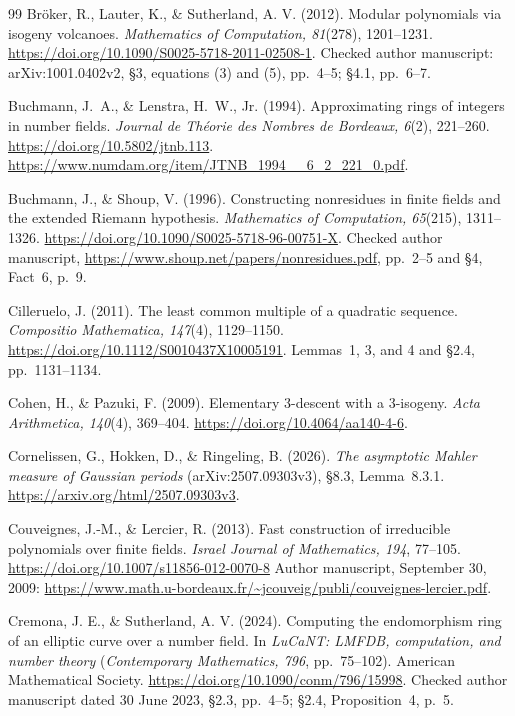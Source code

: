 \documentclass[11pt]{article}
\theoremstyle{definition}
\theoremstyle{remark}
\begin{document}
\begin{thebibliography}{99}
Br\"oker, R., Lauter, K., \& Sutherland, A. V. (2012).
Modular polynomials via isogeny volcanoes.
\emph{Mathematics of Computation, 81}(278), 1201--1231.
\url{https://doi.org/10.1090/S0025-5718-2011-02508-1}.
Checked author manuscript: arXiv:1001.0402v2, \S3, equations (3)
and (5), pp.~4--5; \S4.1, pp.~6--7.

Buchmann, J.~A., \& Lenstra, H.~W., Jr. (1994).
Approximating rings of integers in number fields.
\emph{Journal de Th\'eorie des Nombres de Bordeaux, 6}(2), 221--260.
\url{https://doi.org/10.5802/jtnb.113}.
\url{https://www.numdam.org/item/JTNB_1994__6_2_221_0.pdf}.

Buchmann, J., \& Shoup, V. (1996).
Constructing nonresidues in finite fields and the extended Riemann hypothesis.
\emph{Mathematics of Computation, 65}(215), 1311--1326.
\url{https://doi.org/10.1090/S0025-5718-96-00751-X}.
Checked author manuscript, \url{https://www.shoup.net/papers/nonresidues.pdf},
pp.~2--5 and \S4, Fact~6, p.~9.

Cilleruelo, J. (2011).
The least common multiple of a quadratic sequence.
\emph{Compositio Mathematica, 147}(4), 1129--1150.
\url{https://doi.org/10.1112/S0010437X10005191}.
Lemmas~1, 3, and 4 and \S2.4, pp.~1131--1134.

Cohen, H., \& Pazuki, F. (2009).
Elementary 3-descent with a 3-isogeny.
\emph{Acta Arithmetica, 140}(4), 369--404.
\url{https://doi.org/10.4064/aa140-4-6}.

Cornelissen, G., Hokken, D., \& Ringeling, B. (2026).
\emph{The asymptotic Mahler measure of Gaussian periods}
(arXiv:2507.09303v3), \S8.3, Lemma~8.3.1.
\url{https://arxiv.org/html/2507.09303v3}.

Couveignes, J.-M., \& Lercier, R. (2013).
Fast construction of irreducible polynomials over finite fields.
\emph{Israel Journal of Mathematics, 194}, 77--105.
\url{https://doi.org/10.1007/s11856-012-0070-8}
Author manuscript, September 30, 2009:
\url{https://www.math.u-bordeaux.fr/~jcouveig/publi/couveignes-lercier.pdf}.

Cremona, J. E., \& Sutherland, A. V. (2024).
Computing the endomorphism ring of an elliptic curve over a number field.
In \emph{LuCaNT: LMFDB, computation, and number theory}
(\emph{Contemporary Mathematics, 796}, pp.~75--102).
American Mathematical Society.
\url{https://doi.org/10.1090/conm/796/15998}.
Checked author manuscript dated 30 June 2023, \S2.3, pp.~4--5;
\S2.4, Proposition~4, p.~5.


\end{thebibliography}
\end{document}
